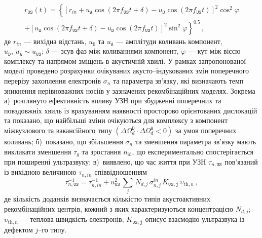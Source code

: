 \begin{multline}
\label{eqrUS}
r_\mathtt{US}(t)=\left\{[r_{in}+u_\mathtt{A}\cos(2\pi f_\mathtt{US}t+\delta)-u_\mathtt{D}\cos(2\pi f_\mathtt{US}t)]^2\cos^2\varphi \right.\\
    \left.+ [u_\mathtt{A}\cos(2\pi f_\mathtt{US}t+\delta)-u_\mathtt{D}\cos(2\pi f_\mathtt{US}t)]^2\sin^2\varphi\right\}^{0.5}\,,
\end{multline}
де
$r_{in}$ --- вихідна відстань,
$u_\mathtt{D}$ та $u_\mathtt{A}$ --- амплітуди коливань компонент, $u_\mathtt{D},\,u_\mathtt{A}\sim u_\mathtt{US}$;
$\delta$ --- зсув фаз між коливаннями компонент,
$\varphi$ --- кут між віссю комплексу та напрямом зміщень в акустичній хвилі.
У рамках запропонованої моделі проведено розрахунки очікуваних акусто--індукованих змін поперечного перерізу захоплення електронів $\sigma_{n}$ та параметра зв'язку,
які визначають темп зникнення нерівноважних носіїв
у зазначених рекомбінаційних моделях.
Зокрема
а)~розглянуто ефективність впливу УЗН при збудженні поперечних та повздовжніх хвиль із врахуванням наявності просторово орієнтованих дислокацій та показано, що найбільші зміни очікуються для
   комплексу з компонент міжвузлового та вакансійного типу $(\Delta\Omega_d^\mathtt{D}\cdot\Delta\Omega_d^\mathtt{A}<0)$
 за умов поперечних коливань;
б)~показано, що збільшення $\sigma_{n}$ та зменшення параметра зв'язку мають викликати зменшення $\tau_g$ та зростання $n_\mathrm{id}$, що експериментально спостерігається при поширенні ультразвуку;
в)~виявлено, що час життя при УЗН $\tau_{n,\mathtt{US}}$ пов'язаний із вихідною величиною $\tau_{n,in}$ співвідношенням
\begin{equation}
\label{eqEpsSigUSA}
\tau_{n,\mathtt{US}}^{-1}=
\tau_{n,in}^{-1}+u_{\mathtt{US}}^2\,\sum_j\,N_{d,j}\,\sigma_{n,j}^{in}\,K_\mathtt{US,j}\,\upsilon_{\mathrm{th},n}\,,
\end{equation}
де
кількість доданків визначається кількістю типів акустоактивних рекомбінаційних центрів,
кожний з яких характеризуються концентрацією $N_{d,j}$;
$\upsilon_{\mathrm{th},n}$ --- теплова швидкість електронів;
$K_\mathtt{US,j}$ описує взаємодію ультразвука із дефектом $j$--го типу.




